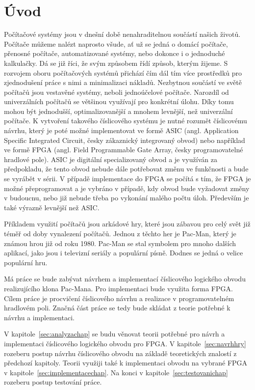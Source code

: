 \documentclass{report}
\begin{document}
\chapter*{Úvod}
Počítačové systémy jsou v dnešní době nenahraditelnou součástí našich životů. Počítače můžeme nalézt naprosto všude, ať už se jedná o domácí počítače, přenosné počítače, automatizované systémy, nebo dokonce i o jednoduché kalkulačky. Dá se již říci, že svým způsobem řídí způsob, kterým žijeme. S rozvojem oboru počítačových systémů přichází čím dál tím více prostředků pro zjednodušení práce s nimi a minimalizaci nákladů. Nezbytnou součástí ve světě počítačů jsou vestavěné systémy, neboli jednoúčelové počítače. Narozdíl od univerzálních počítačů se většinou využívají pro konkrétní úlohu. Díky tomu mohou být jednodušší, optimalizovanější a mnohem levnější, než univerzální počítače. K vytvoření takového číslicového systému je nutné rozumět číslicovému návrhu, který je poté možné implementovat ve formě ASIC (angl. Application Specific Integrated Circuit, česky zákaznický integrovaný obvod) nebo například ve formě FPGA (angl. Field Programmable Gate Array, česky programovatelné hradlové pole). ASIC je digitální specializovaný obvod a je využíván za předpokladu, že tento obvod nebude dále potřebovat změnu ve funkčnosti a bude se vyrábět v sérii. V případě implementace do FPGA se počítá s tím, že FPGA je možné přeprogramovat a je vybráno v případě, kdy obvod bude vyžadovat změny v budoucnu, nebo již nebude třeba po vykonání malého počtu úloh. Především je také výrazně levnější než ASIC. \par

Příkladem využití počítačů jsou arkádové hry, které jsou zábavou pro celý svět již téměř od doby vynalezení počítačů. Jednou z těchto her je Pac-Man, který je známou hrou již od roku 1980. Pac-Man se stal symbolem pro mnoho dalších aplikací, jako jsou i televizní seriály a populární písně. Dodnes se jedná o velice populární hru.\par

Má práce se bude zabývat návrhem a implementací číslicového logického obvodu realizujícího klona Pac-Mana. Pro implementaci bude využita forma FPGA. Cílem práce je procvičení číslicového návrhu a realizace v programovatelném hradlovém poli. Značná část práce se tedy bude skládat z teorie potřebné k návrhu a implementaci.\par

V kapitole~\ref{sec:analyzachap} se budu věnovat teorii potřebné pro návrh a implementaci číslicového logického obvodu pro FPGA. V kapitole~\ref{sec:navrhhry} rozeberu postup návrhu číslicového obvodu na základě teoretických znalostí z předchozí kapitoly. Teorii využiji také k implementaci obvodu na vybrané FPGA v kapitole~\ref{sec:implementacechap}. Na konci v kapitole~\ref{sec:testovanichap} rozeberu postup testování práce.
\end{document}

